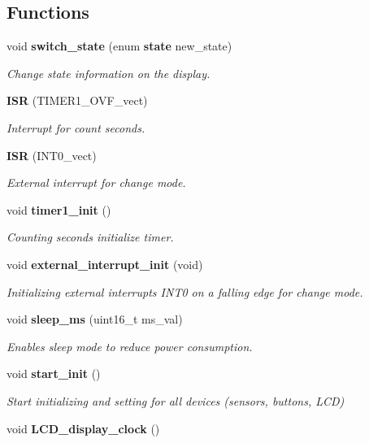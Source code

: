 \subsection*{Functions}
\begin{DoxyCompactItemize}
\item 
void \textbf{ switch\+\_\+state} (enum \textbf{ state} new\+\_\+state)
\begin{DoxyCompactList}\small\item\em Change state information on the display. \end{DoxyCompactList}\item 
\textbf{ I\+SR} (T\+I\+M\+E\+R1\+\_\+\+O\+V\+F\+\_\+vect)
\begin{DoxyCompactList}\small\item\em Interrupt for count seconds. \end{DoxyCompactList}\item 
\textbf{ I\+SR} (I\+N\+T0\+\_\+vect)
\begin{DoxyCompactList}\small\item\em External interrupt for change mode. \end{DoxyCompactList}\item 
void \textbf{ timer1\+\_\+init} ()
\begin{DoxyCompactList}\small\item\em Counting seconds initialize timer. \end{DoxyCompactList}\item 
void \textbf{ external\+\_\+interrupt\+\_\+init} (void)
\begin{DoxyCompactList}\small\item\em Initializing external interrupts I\+N\+T0 on a falling edge for change mode. \end{DoxyCompactList}\item 
void \textbf{ sleep\+\_\+ms} (uint16\+\_\+t ms\+\_\+val)
\begin{DoxyCompactList}\small\item\em Enables sleep mode to reduce power consumption. \end{DoxyCompactList}\item 
void \textbf{ start\+\_\+init} ()
\begin{DoxyCompactList}\small\item\em Start initializing and setting for all devices (sensors, buttons, L\+CD) \end{DoxyCompactList}\item 
void \textbf{ L\+C\+D\+\_\+display\+\_\+clock} ()

\end{DoxyCompactItemize}
